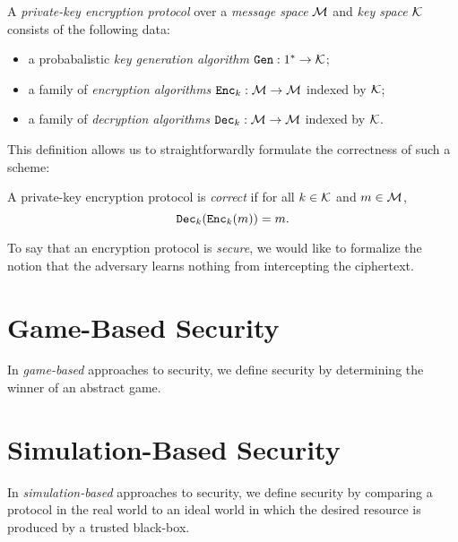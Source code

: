 \begin{dfn}
	A \emph{private-key encryption protocol} over a \emph{message space} $\mathcal{M}$ and
	\emph{key space} $\mathcal{K}$ consists of the following data:
	\begin{itemize}
		\item a probabalistic \emph{key generation algorithm}
		      ${\texttt{Gen}}: 1^*\rightarrow \mathcal{K}$;
		\item a family of \emph{encryption algorithms} ${\texttt{Enc}}_k: \mathcal{M}\rightarrow
			      \mathcal{M}$ indexed by $\mathcal{K}$;
		\item a family of \emph{decryption algorithms} ${\texttt{Dec}}_k:
			      \mathcal{M}\rightarrow\mathcal{M}$ indexed by $\mathcal{K}$.	\end{itemize}
\end{dfn}

This definition allows us to straightforwardly formulate the correctness
of such a scheme:

\begin{dfn}
	A private-key encryption protocol is \emph{correct} if for all $k\in \mathcal{K}$ and
	$m\in \mathcal{M}$, \[
		{\texttt{Dec}}_k({\texttt{Enc}}_k(m)) = m.
	\]
\end{dfn}

To say that an encryption protocol is \emph{secure}, we would like to formalize
the notion that the adversary learns nothing from intercepting the ciphertext.

\section{Game-Based Security}

In \emph{game-based} approaches to security, we define security by determining
the winner of an abstract game.

\section{Simulation-Based Security}

In \emph{simulation-based} approaches to security, we define security by
comparing a protocol in the real world to an ideal world in which the desired
resource is produced by a trusted black-box.

